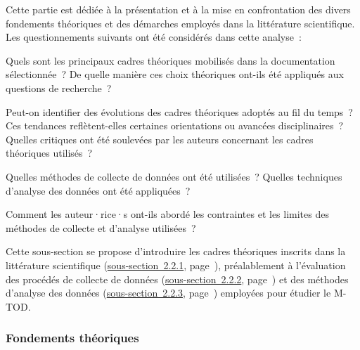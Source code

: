\begin{refsegment}
Cette partie est dédiée à la présentation et à la mise en confrontation des divers fondements théoriques et des démarches employés dans la littérature scientifique. Les questionnements suivants ont été considérés dans cette analyse~:
    \begin{customitemize}
        \item Quels sont les principaux cadres théoriques mobilisés dans la documentation sélectionnée~? De quelle manière ces choix théoriques ont-ils été appliqués aux questions de recherche~?
        \item Peut-on identifier des évolutions des cadres théoriques adoptés au fil du temps~? Ces tendances reflètent-elles certaines orientations ou avancées disciplinaires~? Quelles critiques ont été soulevées par les auteurs concernant les cadres théoriques utilisés~?
        \item Quelles méthodes de collecte de données ont été utilisées~? Quelles techniques d'analyse des données ont été appliquées~?
        \item Comment les auteur·rice·s ont-ils abordé les contraintes et les limites des méthodes de collecte et d'analyse utilisées~?
    \end{customitemize}%

Cette sous-section se propose d'introduire les cadres théoriques inscrits dans la littérature scientifique (\hyperref[chap2:fondements-theoriques]{sous-section~2.2.1}, page~\pageref{chap2:fondements-theoriques}), préalablement à l'évaluation des procédés de collecte de données (\hyperref[chap2:methodes-collecte-donnees]{sous-section~2.2.2}, page~\pageref{chap2:methodes-collecte-donnees}) et des méthodes d'analyse des données (\hyperref[chap2:demarches-types-analyses]{sous-section~2.2.3}, page~\pageref{chap2:demarches-types-analyses}) employées pour étudier le \acrshort{M-TOD}.%

\subsubsection*{Fondements théoriques
    \label{chap2:fondements-theoriques}
    }
    

\end{refsegment}
